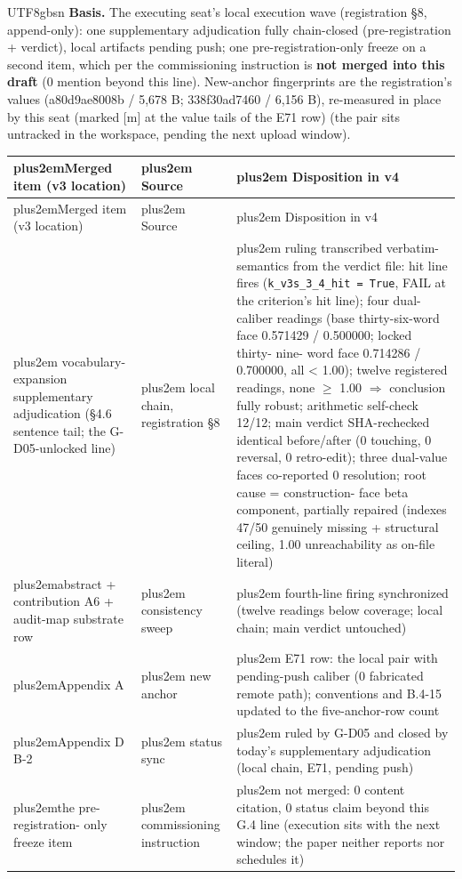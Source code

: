 \documentclass[11pt,letterpaper]{article}
\newcommand{\RaggedRight}{\rightskip=0pt plus2em\relax}
\begin{document}
\begin{CJK}{UTF8}{gbsn}
\textbf{Basis.} The executing seat's local execution wave (registration \S{}8, append-only): one supplementary adjudication fully chain-closed (pre-registration + verdict), local artifacts pending push; one pre-registration-only freeze on a second item, which per the commissioning instruction is \textbf{not merged into this draft} (0 mention beyond this line). New-anchor fingerprints are the registration's values (a80d9ae8008b / 5,678 B; 338f30ad7460 / 6,156 B), re-measured in place by this seat (marked [m] at the value tails of the E71 row) (the pair sits untracked in the workspace, pending the next upload window).

{\small\begin{longtable}{>{\RaggedRight\arraybackslash}p{4.57cm} >{\RaggedRight\arraybackslash}p{4.57cm} >{\RaggedRight\arraybackslash}p{4.57cm}}
\toprule
Merged item (v3 location) & Source & Disposition in v4 \\
\midrule
\endfirsthead
\toprule
Merged item (v3 location) & Source & Disposition in v4 \\
\midrule
\endhead
\endfoot
\bottomrule
\endlastfoot
vocabulary-\penalty-100 expansion supplementary adjudication (\S{}4.6 sentence tail; the G-D05-unlocked line) & local chain, registration \S{}8 & ruling transcribed verbatim-\penalty-100 semantics from the verdict file: hit line fires (\texttt{k\_v3s\_3\_4\_hit = True}, FAIL at the criterion's hit line); four dual-caliber readings (base thirty-six-word face 0.571429 / 0.500000; locked thirty-\penalty-100 nine-\penalty-100 word face 0.714286 / 0.700000, all < 1.00); twelve registered readings, none \ensuremath{\geq} 1.00 \ensuremath{\Rightarrow} conclusion fully robust; arithmetic self-check 12/12; main verdict SHA-rechecked identical before/after (0 touching, 0 reversal, 0 retro-edit); three dual-value faces co-reported 0 resolution; root cause = construction-\penalty-100 face beta component, partially repaired (indexes 47/50 genuinely missing + structural ceiling, 1.00 unreachability as on-file literal) \\
abstract + contribution A6 + audit-map substrate row & consistency sweep & fourth-line firing synchronized (twelve readings below coverage; local chain; main verdict untouched) \\
Appendix A & new anchor & E71 row: the local pair with pending-push caliber (0 fabricated remote path); conventions and B.4-15 updated to the five-anchor-row count \\
Appendix D B-2 & status sync & ruled by G-D05 and closed by today's supplementary adjudication (local chain, E71, pending push) \\
the pre-\penalty-100 registration-\penalty-100 only freeze item & commissioning instruction & not merged: 0 content citation, 0 status claim beyond this G.4 line (execution sits with the next window; the paper neither reports nor schedules it) \\
\end{longtable}}


\end{CJK}
\end{document}
